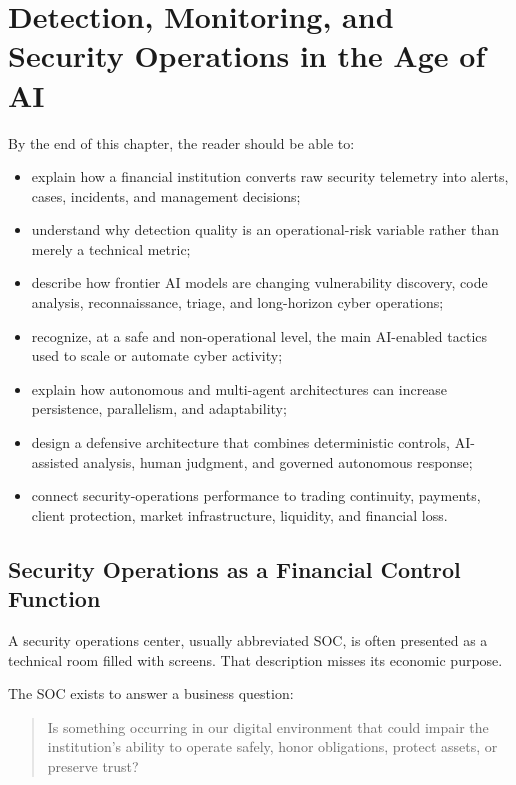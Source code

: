 \chapter{Detection, Monitoring, and Security Operations in the Age of AI}

\begin{learningobjectives}
By the end of this chapter, the reader should be able to:
\begin{itemize}
    \item explain how a financial institution converts raw security telemetry into alerts, cases, incidents, and management decisions;
    \item understand why detection quality is an operational-risk variable rather than merely a technical metric;
    \item describe how frontier AI models are changing vulnerability discovery, code analysis, reconnaissance, triage, and long-horizon cyber operations;
    \item recognize, at a safe and non-operational level, the main AI-enabled tactics used to scale or automate cyber activity;
    \item explain how autonomous and multi-agent architectures can increase persistence, parallelism, and adaptability;
    \item design a defensive architecture that combines deterministic controls, AI-assisted analysis, human judgment, and governed autonomous response;
    \item connect security-operations performance to trading continuity, payments, client protection, market infrastructure, liquidity, and financial loss.
\end{itemize}
\end{learningobjectives}

\section{Security Operations as a Financial Control Function}

A security operations center, usually abbreviated SOC, is often presented as a technical room filled with screens. That description misses its economic purpose.

The SOC exists to answer a business question:

\begin{quote}
Is something occurring in our digital environment that could impair the institution's ability to operate safely, honor obligations, protect assets, or preserve trust?
\end{quote}

